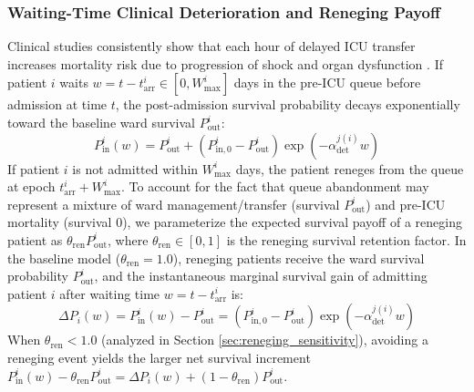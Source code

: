 \documentclass[final,5p,times,twocolumn]{elsarticle}
\begin{document}
\subsubsection{Waiting-Time Clinical Deterioration and Reneging Payoff}
Clinical studies consistently show that each hour of delayed ICU transfer increases mortality risk due to progression of shock and organ dysfunction \cite{cardoso2011impact, kim2015association}. If patient $i$ waits $w = t - t_{\text{arr}}^i \in [0, W_{\max}^i]$ days in the pre-ICU queue before admission at time $t$, the post-admission survival probability decays exponentially toward the baseline ward survival $P_{\text{out}}^i$:
\begin{equation}
    P_{\text{in}}^i(w) = P_{\text{out}}^i + \left( P_{\text{in},0}^i - P_{\text{out}}^i \right) \exp\!\left( -\alpha_{\text{det}}^{j(i)} w \right)
    \label{eq:deterioration}
\end{equation}
If patient $i$ is not admitted within $W_{\max}^i$ days, the patient reneges from the queue at epoch $t_{\text{arr}}^i + W_{\max}^i$. To account for the fact that queue abandonment may represent a mixture of ward management/transfer (survival $P_{\text{out}}^i$) and pre-ICU mortality (survival $0$), we parameterize the expected survival payoff of a reneging patient as $\theta_{\text{ren}} P_{\text{out}}^i$, where $\theta_{\text{ren}} \in [0, 1]$ is the reneging survival retention factor. In the baseline model ($\theta_{\text{ren}} = 1.0$), reneging patients receive the ward survival probability $P_{\text{out}}^i$, and the instantaneous marginal survival gain of admitting patient $i$ after waiting time $w = t - t_{\text{arr}}^i$ is:
\begin{equation}
    \Delta P_i(w) = P_{\text{in}}^i(w) - P_{\text{out}}^i = \left( P_{\text{in},0}^i - P_{\text{out}}^i \right) \exp\!\left( -\alpha_{\text{det}}^{j(i)} w \right)
    \label{eq:marginal_gain}
\end{equation}
When $\theta_{\text{ren}} < 1.0$ (analyzed in Section \ref{sec:reneging_sensitivity}), avoiding a reneging event yields the larger net survival increment $P_{\text{in}}^i(w) - \theta_{\text{ren}} P_{\text{out}}^i = \Delta P_i(w) + (1 - \theta_{\text{ren}}) P_{\text{out}}^i$.
\end{document}

